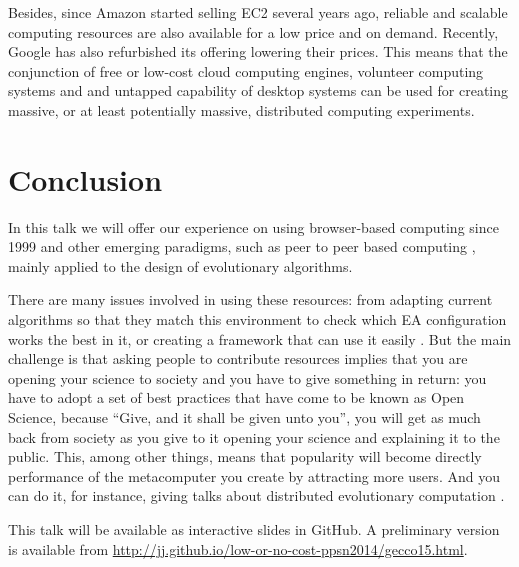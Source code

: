 \documentclass{svmult}
\begin{document}
Besides, since Amazon started selling EC2 several years ago, reliable and scalable computing resources are also available for a low price and on demand. Recently, Google has also refurbished its offering lowering their prices. This means that the conjunction of free or low-cost cloud computing engines, volunteer computing systems and and untapped capability of desktop systems can be used for creating massive, or at least potentially massive, distributed computing experiments.

\section{Conclusion}

In this talk we will offer our experience on using browser-based computing since 1999 \cite{jesusIWANN99} and other emerging paradigms, such as peer to peer based computing \cite{evag:gpem}, mainly applied to the design of evolutionary algorithms. 

There are many issues involved in using these resources: from adapting
current algorithms so that they match this environment \cite{agajaj}
to check which EA configuration works the best in it, or creating a
framework that can use it easily \cite{nodeo2014}. But the main
challenge is that asking people to contribute resources implies that
you are opening your science to society and you have to give something
in return: you have to adopt a set of best practices that have come to
be known as Open Science, because ``Give, and it shall be given unto
you'', you will get as much back from society as you give to it
opening your science and explaining it to the public. This, among
other things, means that popularity will become directly performance
of the metacomputer you create by attracting more users. And you can
do it, for instance, giving talks about distributed evolutionary
computation \cite{arxiv:modeling}.

This talk will be available as interactive slides in GitHub. A
preliminary version is available from
\url{http://jj.github.io/low-or-no-cost-ppsn2014/gecco15.html}. 





\end{document}
